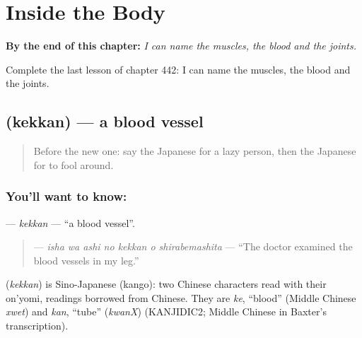
\chapter{Inside the Body}
\label{ch:ja-inside-the-body}

\begin{chapteropening}
\textbf{By the end of this chapter:} \emph{I can name the muscles, the blood and the joints.}

Complete the last lesson of chapter 442: I can name the muscles, the blood and the joints.
\end{chapteropening}

\section[\texorpdfstring{\ja{けっかん} (kekkan)}{けっかん (kekkan)}]{ (kekkan) — a blood vessel}

\label{lesson:JA-C442-kekkan}



\begin{quote}
Before the new one: say the Japanese for a lazy person, then the Japanese for to fool around.
\end{quote}

\subsection*{You'll want to know: }
\textbf{} — \emph{kekkan} — \textquotedblleft{}a blood vessel\textquotedblright{}.

\begin{quote}
\textbf{   } — \emph{isha wa ashi no kekkan o shirabemashita} — \textquotedblleft{}The doctor examined the blood vessels in my leg.\textquotedblright{}
\end{quote}

\begin{cousinweb}
\textbf{} (\emph{kekkan}) is Sino-Japanese (kango): two Chinese characters read with their on'yomi, readings borrowed from Chinese. They are \emph{ke}, \textquotedblleft{}blood\textquotedblright{} (Middle Chinese \emph{xwet}) and \emph{kan}, \textquotedblleft{}tube\textquotedblright{} (\emph{kwanX}) (KANJIDIC2; Middle Chinese in Baxter's transcription).
\end{cousinweb}

